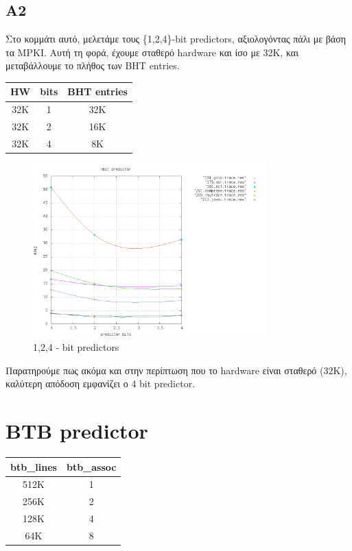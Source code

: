 \documentclass[a4paper,10pt]{article}
\begin{document}

\pagebreak


\subsection*{A2}
Στο κομμάτι αυτό, μελετάμε τους \{1,2,4\}-bit predictors, αξιολογόντας πάλι με
βάση τα MPKI. Αυτή τη φορά, έχουμε σταθερό hardware και ίσο με 32Κ, και
μεταβάλλουμε το πλήθος των BHT entries.
\\

\begin{tabular}{c c c}
	HW & bits & BHT entries \\
	\hline
	\hline
	32K & 1 & 32K	\\
	\hline
	32K & 2 & 16K	\\
	\hline
	32K & 4 & 8K	\\
\end{tabular}

\begin{figure}[H]
	\centering
	\includegraphics[width=0.8\textwidth]{../Results/part2/results_A2.png}
	\caption{1,2,4 - bit predictors}
\end{figure}

Παρατηρούμε πως ακόμα και στην περίπτωση που το hardware είναι σταθερό (32K),
καλύτερη απόδοση εμφανίζει ο 4 bit predictor.

\pagebreak


\section*{BTB predictor}

\begin{tabular}{c c}
	btb\_lines & btb\_assoc \\
	\hline
	\hline
	512K & 1 \\
	\hline
	256K & 2 \\
	\hline
	128K & 4 \\
	\hline
	64K  & 8 \\

\end{tabular}
\end{document}
